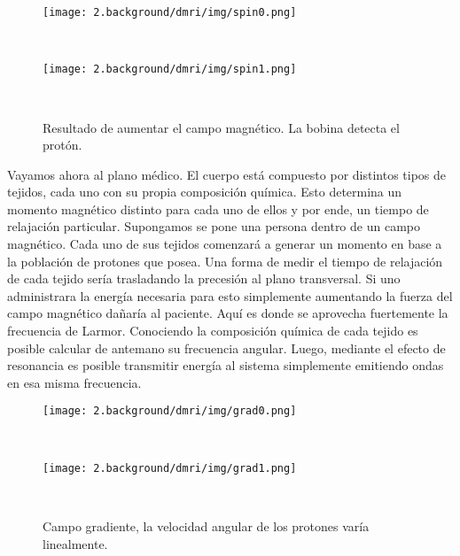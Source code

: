 \begin{figure}[h!]

\begin{minipage}[b]{0.49\textwidth}
    \texttt{[image: 2.background/dmri/img/spin0.png]}
    \caption{$Spin$ sometido a un campo magn\'etico debil. La bobina no
             detecta el prot\'on.}
    \label{fig:nosignal}
\end{minipage} ~ %
\hfill
\begin{minipage}[b]{0.49\textwidth}
    \texttt{[image: 2.background/dmri/img/spin1.png]}
    \caption{Resultado de aumentar el campo magn\'etico. La bobina 
             detecta el prot\'on.}
    \label{fig:signal}    
\end{minipage} ~ %

\end{figure}

Vayamos ahora al plano m\'edico. El cuerpo est\'a compuesto por distintos 
tipos de tejidos, cada uno con su propia composici\'on qu\'imica. Esto 
determina un momento magn\'etico distinto para cada uno de ellos y por
ende, un tiempo de relajaci\'on particular. Supongamos se pone una persona
dentro de un campo magn\'etico. Cada uno de sus tejidos comenzar\'a a 
generar un momento en base a la poblaci\'on de protones que posea. 
Una forma de medir el tiempo de relajaci\'on de cada tejido ser\'ia
trasladando la precesi\'on al plano transversal. Si uno administrara 
la energ\'ia necesaria para esto simplemente aumentando la fuerza del
campo magn\'etico
da\~nar\'ia al paciente. Aqu\'i es donde se aprovecha fuertemente la
frecuencia de Larmor. Conociendo la composici\'on qu\'imica de cada tejido
es posible calcular de antemano su frecuencia angular. Luego, mediante el
efecto de resonancia es posible transmitir energ\'ia al sistema
simplemente emitiendo ondas en esa misma frecuencia. \\

\begin{figure}[h!]
                                                                                                                        
\begin{minipage}[b]{0.49\textwidth}
    \texttt{[image: 2.background/dmri/img/grad0.png]}
    \caption{\small  Campo uniforme, todos los protones poseen la misma velocidad angular.}
     \label{fig:unif}
\end{minipage} ~
\hfill
\begin{minipage}[b]{0.49\textwidth}
    \texttt{[image: 2.background/dmri/img/grad1.png]}
    \caption{\small Campo gradiente, la velocidad angular de los protones var\'ia linealmente. }
    \label{fig:grad}
\end{minipage} ~

\end{figure}  


